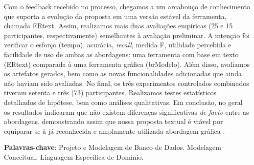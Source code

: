 \begin{resumo}[Resumo]
Com o feedback recebido no processo, chegamos a um arcabouço de conhecimento que suporta a evolução da proposta em uma versão estável da ferramenta, chamada ERtext.
Assim, realizamos mais duas avaliações empíricas (25 e 15 participantes, respectivamente) semelhantes à avaliação preliminar.
A intenção foi verificar o esforço (tempo), acurácia, \textit{recall}, medida F, utilidade percebida e facilidade de uso de ambas as abordagens: uma ferramenta com base em texto (ERtext) comparada à uma ferramenta gráfica (brModelo).
Além disso, avaliamos os artefatos gerados, bem como as novas funcionalidades adicionadas que ainda não haviam sido avaliadas.
No final, os três experimentos controlados combinados tiveram setenta e três (73) participantes.
Realizamos testes estatísticos detalhados de hipótese, bem como análises qualitativas.
Em conclusão, no geral os resultados indicaram que não existem diferenças significativas \textit{de facto} entre as abordagens, demonstrando assim que nossa proposta textual é viável por equiparar-se à já reconhecida e amplamente utilizada abordagem gráfica .

\vspace{\onelineskip}

 \noindent
 \textbf{Palavras-chave}: Projeto e Modelagem de Banco de Dados. Modelagem Conceitual. Linguagem Específica de Domínio.
\end{resumo}